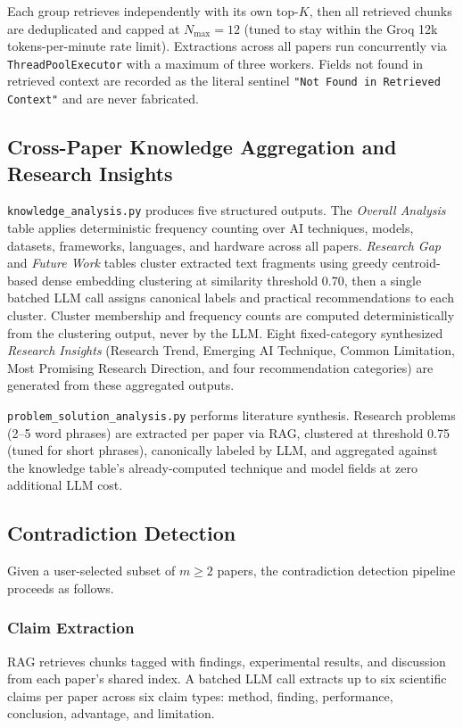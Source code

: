 \documentclass[conference]{IEEEtran}
\begin{document}
Each group retrieves independently with its own top-$K$, then all retrieved
chunks are deduplicated and capped at $N_{\max}{=}12$ (tuned to stay within
the Groq 12k tokens-per-minute rate limit). Extractions across all papers
run concurrently via \texttt{ThreadPoolExecutor} with a maximum of three
workers. Fields not found in retrieved context are recorded as the literal
sentinel \texttt{"Not Found in Retrieved Context"} and are never fabricated.

\subsection{Cross-Paper Knowledge Aggregation and Research Insights}

\texttt{knowledge\_analysis.py} produces five structured outputs.
The \textit{Overall Analysis} table applies deterministic frequency counting
over AI techniques, models, datasets, frameworks, languages, and hardware
across all papers. \textit{Research Gap} and \textit{Future Work} tables
cluster extracted text fragments using greedy centroid-based dense embedding
clustering at similarity threshold 0.70, then a single batched LLM call
assigns canonical labels and practical recommendations to each cluster.
Cluster membership and frequency counts are computed deterministically from
the clustering output, never by the LLM. Eight fixed-category synthesized
\textit{Research Insights} (Research Trend, Emerging AI Technique, Common
Limitation, Most Promising Research Direction, and four recommendation
categories) are generated from these aggregated outputs.

\texttt{problem\_solution\_analysis.py} performs literature synthesis.
Research problems (2--5 word phrases) are extracted per paper via RAG,
clustered at threshold 0.75 (tuned for short phrases), canonically labeled
by LLM, and aggregated against the knowledge table's already-computed
technique and model fields at zero additional LLM cost.

\subsection{Contradiction Detection}

Given a user-selected subset of $m \ge 2$ papers, the contradiction
detection pipeline proceeds as follows.

\subsubsection{Claim Extraction}
RAG retrieves chunks tagged with findings, experimental results, and
discussion from each paper's shared index. A batched LLM call extracts up
to six scientific claims per paper across six claim types: method, finding,
performance, conclusion, advantage, and limitation.
\end{document}
